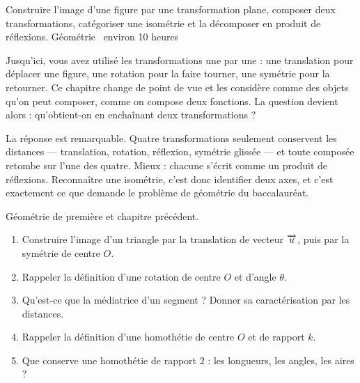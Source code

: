   {Construire l'image d'une figure par une transformation plane, composer deux
   transformations, catégoriser une isométrie et la décomposer en produit de
   réflexions.}
  {Géométrie \textbullet\ environ 10 heures}

Jusqu'ici, vous avez utilisé les transformations une par une : une translation
pour déplacer une figure, une rotation pour la faire tourner, une symétrie
pour la retourner. Ce chapitre change de point de vue et les considère comme
des objets qu'on peut composer, comme on compose deux fonctions. La question
devient alors : qu'obtient-on en enchaînant deux transformations ?

La réponse est remarquable. Quatre transformations seulement conservent les
distances — translation, rotation, réflexion, symétrie glissée — et toute
composée retombe sur l'une des quatre. Mieux : chacune s'écrit comme un
produit de réflexions. Reconnaître une isométrie, c'est donc identifier deux
axes, et c'est exactement ce que demande le problème de géométrie du
baccalauréat.

\begin{revision}
Géométrie de première et chapitre précédent.

\begin{enumerate}[label=\textbf{\arabic*.}, leftmargin=*, itemsep=0.35em]
  \item Construire l'image d'un triangle par la translation de vecteur
        $\overrightarrow{u}$, puis par la symétrie de centre $O$.
  \item Rappeler la définition d'une rotation de centre $O$ et d'angle
        $\theta$.
  \item Qu'est-ce que la médiatrice d'un segment ? Donner sa caractérisation
        par les distances.
  \item Rappeler la définition d'une homothétie de centre $O$ et de rapport
        $k$.
  \item Que conserve une homothétie de rapport $2$ : les longueurs, les
        angles, les aires ?
\end{enumerate}
\end{revision}

